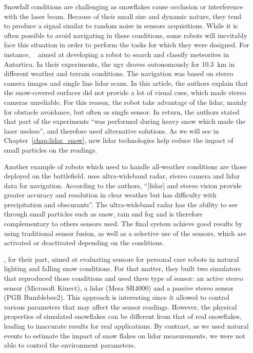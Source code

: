 Snowfall conditions are challenging as snowflakes cause occlusion or interference with the laser beam. Because of their small size and dynamic nature, they tend to produce a signal similar to random noise in sensors acquisitions. While it is often possible to avoid navigating in these conditions, some robots will inevitably face this situation in order to perform the tasks for which they were designed. For instance, ~\citet{Moorehead_1999_2122} aimed at developing a robot to search and classify meteorites in Antartica. In their experiments, the \gls*{ugv} droves autonomously for \SI{10.3}{\kilo\meter} in different weather and terrain conditions. The navigation was based on stereo camera images and single line \gls*{lidar} scans. In this article, the authors explain that the snow-covered surfaces did not provide a lot of visual cues, which made stereo cameras unreliable. For this reason, the robot take advantage of the \gls*{lidar}, mainly for obstacle avoidance, but often as single sensor. In return, the authors stated that part of the experiments \enquote{was performed during heavy snow which made the laser useless}, and therefore used alternative solutions. As we will see in Chapter~\ref{chap:lidar_snow}, new \gls*{lidar} technologies help reduce the impact of small particles on the readings. 

Another example of robots which need to handle all-weather conditions are those deployed on the battlefield. \citet{yamauchi2010fusing} uses ultra-wideband radar, stereo camera and \gls*{lidar} data for navigation. According to the authors, \enquote{[\gls*{lidar}] and stereo vision provide greater accuracy and resolution in clear weather but has difficulty with precipitation and obscurants}. The ultra-wideband radar has the ability to see through small particles such as snow, rain and fog and is therefore complementary to others sensors used. The final system achieve good results by using traditional sensor fusion, as well as a selective use of the sensors, which are activated or deactivated depending on the conditions. 

\citet{sumi-arso-13}, for their part, aimed at evaluating sensors for personal care robots in natural lighting and falling snow conditions. For that matter, they built two simulators that reproduced those conditions and used three type of sensor: an active stereo sensor (Microsoft Kinect), a \gls*{lidar} (Mesa SR4000) and a passive stereo sensor (PGR Bumblebee2). This approach is interesting since it allowed to control various parameters that may affect the sensor readings. However, the physical properties of simulated snowflakes can be different from that of real snowflakes, leading to inaccurate results for real applications. By contrast, as we used natural events to estimate the impact of snow flakes on \gls*{lidar} measurements, we were not able to control the environment parameters.

